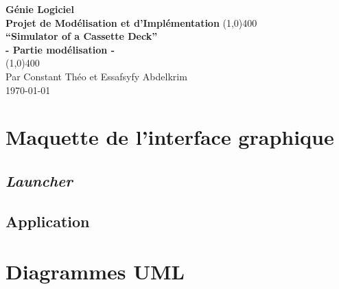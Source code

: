 \documentclass[11pt]{article}
\begin{document}
\begin{titlepage}
\begin{center}
\vspace*{1cm}
\Large{\textbf{Génie Logiciel}}\\
\Large{\textbf{Projet de Modélisation et d’Implémentation}}
\vfill
\line(1,0){400}\\[1mm]
\huge{\textbf{“Simulator of a Cassette Deck”}}\\[3mm]
\Large{\textbf{- Partie modélisation -}}\\[1mm]
\line(1,0){400}\\
\vfill
Par Constant Théo et Essafsyfy Abdelkrim\\
\today
\end{center}
\end{titlepage}

\tableofcontents
\thispagestyle{empty} %
\clearpage %

\setcounter{page}{1} %

\section{Maquette de l'interface graphique}
\subsection{\textit{Launcher}}
\subsection{Application}
\section{Diagrammes UML}
\end{document}
